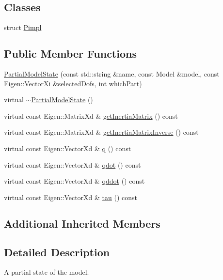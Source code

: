 \subsection*{Classes}
\begin{DoxyCompactItemize}
\item 
struct \hyperlink{structocra_1_1PartialModelState_1_1Pimpl}{Pimpl}
\end{DoxyCompactItemize}
\subsection*{Public Member Functions}
\begin{DoxyCompactItemize}
\item 
\hyperlink{classocra_1_1PartialModelState_aad632d12d35f5982df12d949f92d4937}{Partial\+Model\+State} (const std\+::string \&name, const Model \&model, const Eigen\+::\+Vector\+Xi \&selected\+Dofs, int which\+Part)
\item 
virtual \hyperlink{classocra_1_1PartialModelState_a59cf8faac5922dc7691c540d519fa705}{$\sim$\+Partial\+Model\+State} ()
\item 
virtual const Eigen\+::\+Matrix\+Xd \& \hyperlink{classocra_1_1PartialModelState_a9fe03ab8c3c4afe56ee4b59f96ac4a25}{get\+Inertia\+Matrix} () const
\item 
virtual const Eigen\+::\+Matrix\+Xd \& \hyperlink{classocra_1_1PartialModelState_a664e4f70861eefde844dca6dd09a2213}{get\+Inertia\+Matrix\+Inverse} () const
\item 
virtual const Eigen\+::\+Vector\+Xd \& \hyperlink{classocra_1_1PartialModelState_ac50f637a2ce55608b4159b7dac2c543d}{q} () const
\item 
virtual const Eigen\+::\+Vector\+Xd \& \hyperlink{classocra_1_1PartialModelState_a8707827d456a8c406d95c1cd4fc2e0b7}{qdot} () const
\item 
virtual const Eigen\+::\+Vector\+Xd \& \hyperlink{classocra_1_1PartialModelState_a9be011bf4005c0b964f857a82b2b2b23}{qddot} () const
\item 
virtual const Eigen\+::\+Vector\+Xd \& \hyperlink{classocra_1_1PartialModelState_a286258284aa61c902106a6b0fcdde9ca}{tau} () const
\end{DoxyCompactItemize}
\subsection*{Additional Inherited Members}


\subsection{Detailed Description}
A partial state of the model. 

